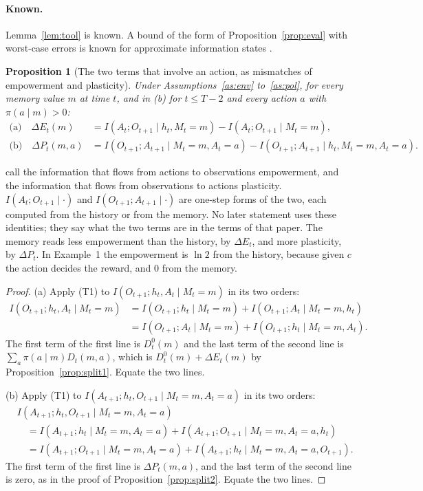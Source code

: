 \documentclass{article}
\newtheorem{proposition}{Proposition}[section]
\theoremstyle{definition}
\newcommand{\dE}{\Delta E}
\newcommand{\dP}{\Delta P}
\newcommand{\why}[1]{\tag*{\small(#1)}}
\begin{document}
\paragraph{Known.} Lemma~\ref{lem:tool} is known. A bound of the form of Proposition~\ref{prop:eval} with worst-case errors is known for approximate information states \citep{subramanian2022approximate}.

\begin{proposition}[The two terms that involve an action, as mismatches of empowerment and plasticity]\label{prop:ep}
Under Assumptions~\ref{as:env} to~\ref{as:pol}, for every memory value $m$ at time $t$, and in (b) for $t\le T-2$ and every action $a$ with $\pi(a\mid m)>0$:
\begin{align*}
\text{(a)}\quad\dE_t(m)&=I(A_t;O_{t+1}\mid h_t,M_t=m)-I(A_t;O_{t+1}\mid M_t=m),\\
\text{(b)}\quad\dP_t(m,a)&=I(O_{t+1};A_{t+1}\mid M_t=m,A_t=a)-I(O_{t+1};A_{t+1}\mid h_t,M_t=m,A_t=a).
\end{align*}
\end{proposition}

\citet{abel2025plasticity} call the information that flows from actions to observations empowerment, and the information that flows from observations to actions plasticity. $I(A_t;O_{t+1}\mid\cdot)$ and $I(O_{t+1};A_{t+1}\mid\cdot)$ are one-step forms of the two, each computed from the history or from the memory. No later statement uses these identities; they say what the two terms are in the terms of that paper. The memory reads less empowerment than the history, by $\dE_t$, and more plasticity, by $\dP_t$. In Example~1 the empowerment is $\ln2$ from the history, because given $c$ the action decides the reward, and $0$ from the memory.

\begin{proof}
(a) Apply (T1) to $I(O_{t+1};h_t,A_t\mid M_t=m)$ in its two orders:
\begin{align*}
I(O_{t+1};h_t,A_t\mid M_t=m)&=I(O_{t+1};h_t\mid M_t=m)+I(O_{t+1};A_t\mid M_t=m,h_t) \why{T1}\\
&=I(O_{t+1};A_t\mid M_t=m)+I(O_{t+1};h_t\mid M_t=m,A_t) \why{T1}.
\end{align*}
The first term of the first line is $D^0_t(m)$ and the last term of the second line is $\sum_a\pi(a\mid m)D_t(m,a)$, which is $D^0_t(m)+\dE_t(m)$ by Proposition~\ref{prop:split1}. Equate the two lines.

(b) Apply (T1) to $I(A_{t+1};h_t,O_{t+1}\mid M_t=m,A_t=a)$ in its two orders:
\begin{align*}
&I(A_{t+1};h_t,O_{t+1}\mid M_t=m,A_t=a)\\
&\quad=I(A_{t+1};h_t\mid M_t=m,A_t=a)+I(A_{t+1};O_{t+1}\mid M_t=m,A_t=a,h_t) \why{T1}\\
&\quad=I(A_{t+1};O_{t+1}\mid M_t=m,A_t=a)+I(A_{t+1};h_t\mid M_t=m,A_t=a,O_{t+1}) \why{T1}.
\end{align*}
The first term of the first line is $\dP_t(m,a)$, and the last term of the second line is zero, as in the proof of Proposition~\ref{prop:split2}. Equate the two lines.
\end{proof}
\end{document}

